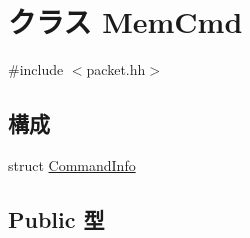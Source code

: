 \hypertarget{classMemCmd}{
\section{クラス MemCmd}
\label{classMemCmd}
}


{\ttfamily \#include $<$packet.hh$>$}\subsection*{構成}
\begin{DoxyCompactItemize}
\item 
struct \hyperlink{structMemCmd_1_1CommandInfo}{CommandInfo}
\end{DoxyCompactItemize}
\subsection*{Public 型}
